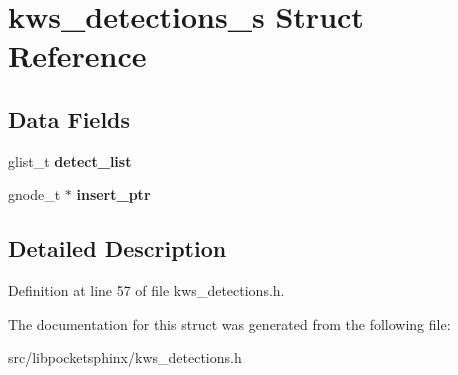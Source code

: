 \section{kws\-\_\-detections\-\_\-s Struct Reference}
\label{structkws__detections__s}
\subsection*{Data Fields}
\begin{DoxyCompactItemize}
\item 
glist\-\_\-t {\bfseries detect\-\_\-list}\label{structkws__detections__s_a96d224eef9abcc3029e0f8f20e5d6bcf}

\item 
gnode\-\_\-t $\ast$ {\bfseries insert\-\_\-ptr}\label{structkws__detections__s_adc9f53e7499f8ed97124c458eb43fbe4}

\end{DoxyCompactItemize}


\subsection{Detailed Description}


Definition at line 57 of file kws\-\_\-detections.\-h.



The documentation for this struct was generated from the following file\-:\begin{DoxyCompactItemize}
\item 
src/libpocketsphinx/kws\-\_\-detections.\-h\end{DoxyCompactItemize}
